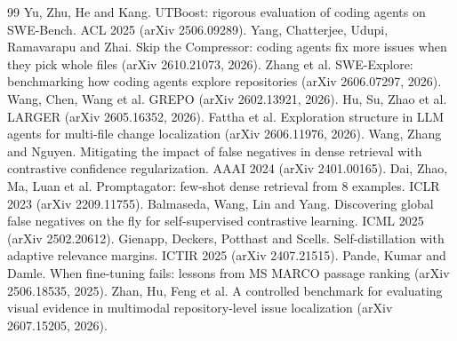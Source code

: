 \documentclass[10pt,twocolumn]{article}
\begin{document}
\begin{thebibliography}{99}
Yu, Zhu, He and Kang. UTBoost: rigorous evaluation of coding agents on SWE-Bench. ACL 2025 (arXiv 2506.09289).
Yang, Chatterjee, Udupi, Ramavarapu and Zhai. Skip the Compressor: coding agents fix more issues when they pick whole files (arXiv 2610.21073, 2026).
Zhang et al. SWE-Explore: benchmarking how coding agents explore repositories (arXiv 2606.07297, 2026).
Wang, Chen, Wang et al. GREPO (arXiv 2602.13921, 2026).
Hu, Su, Zhao et al. LARGER (arXiv 2605.16352, 2026).
Fattha et al. Exploration structure in LLM agents for multi-file change localization (arXiv 2606.11976, 2026).
Wang, Zhang and Nguyen. Mitigating the impact of false negatives in dense retrieval with contrastive confidence regularization. AAAI 2024 (arXiv 2401.00165).
Dai, Zhao, Ma, Luan et al. Promptagator: few-shot dense retrieval from 8 examples. ICLR 2023 (arXiv 2209.11755).
Balmaseda, Wang, Lin and Yang. Discovering global false negatives on the fly for self-supervised contrastive learning. ICML 2025 (arXiv 2502.20612).
Gienapp, Deckers, Potthast and Scells. Self-distillation with adaptive relevance margins. ICTIR 2025 (arXiv 2407.21515).
Pande, Kumar and Damle. When fine-tuning fails: lessons from MS MARCO passage ranking (arXiv 2506.18535, 2025).
Zhan, Hu, Feng et al. A controlled benchmark for evaluating visual evidence in multimodal repository-level issue localization (arXiv 2607.15205, 2026).
\end{thebibliography}
\end{document}
